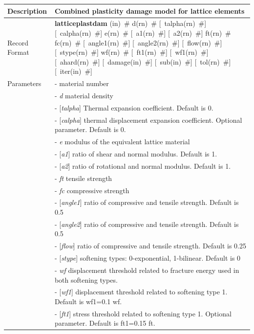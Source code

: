 \documentclass[a4paper]{article}
\newcommand{\descitem}[1]{{\noindent \bf #1}}
\newcommand{\elemparam}[2]{{{#1\tiny (#2)}~\#}}
\newcommand{\optelemparam}[2]{[{~\elemparam{#1}{#2}}]}
\newcommand{\param}[1]{{\it #1}}
\newcommand{\optparam}[1]{[{\it #1}]}
\newenvironment{mmt}{\begin{tabular}{|l|p{9cm}|}}{\end{tabular}\\}
\newenvironment{mmt}{\begin{tabular}{|l|l|}}{\end{tabular}\\}
\begin{document}
\begin{table}[!htb]
\begin{mmt}
\hline
Description & Combined plasticity damage model for lattice elements \\
\hline
Record Format & \descitem{latticeplastdam} \elemparam{}{in} 
\elemparam{d}{rn} \optelemparam{talpha}{rn} \optelemparam{calpha}{rn} \elemparam{e}{rn} \optelemparam{a1}{rn} \optelemparam{a2}{rn} \elemparam{ft}{rn}  \elemparam{fc}{rn} \optelemparam{angle1}{rn}  \optelemparam{angle2}{rn} \optelemparam{flow}{rn} \optelemparam{stype}{rn} \elemparam{wf}{rn} \optelemparam{ft1}{rn} \optelemparam{wf1}{rn}  \optelemparam{ahard}{rn} \optelemparam{damage}{in}  \optelemparam{sub}{in}  \optelemparam{tol}{rn}  \optelemparam{iter}{in}\\
Parameters &- \param{} material number\\
&- \param{d} material density\\
&- \optparam{talpha} Thermal expansion coefficient. Default is 0.\\
&- \optparam{calpha} thermal displacement expansion coefficient. Optional parameter. Default is 0.\\
&- \param{e} modulus of the equivalent lattice material\\
&- \optparam{a1} ratio of shear and normal modulus. Default is 1.\\
&- \optparam{a2} ratio of rotational and normal modulus. Default is 1.\\
&- \param{ft} tensile strength\\
&- \param{fc} compressive strength\\
&- \optparam{angle1} ratio of compressive and tensile strength. Default is 0.5\\
&- \optparam{angle2} ratio of compressive and tensile strength. Default is 0.5\\
&- \optparam{flow} ratio of compressive and tensile strength. Default is 0.25\\
&- \optparam{stype} softening types: 0-exponential, 1-bilinear. Default is 0\\
&- \param{wf} displacement threshold related to fracture energy used in both softening types.\\
&- \optparam{wf1} displacement threshold related to softening type 1. Default is wf1=0.1 wf.\\
&- \optparam{ft1} stress threshold related to softening type 1. Optional parameter. Default is ft1=0.15 ft.\\

\end{mmt}
\end{table}
\end{document}
